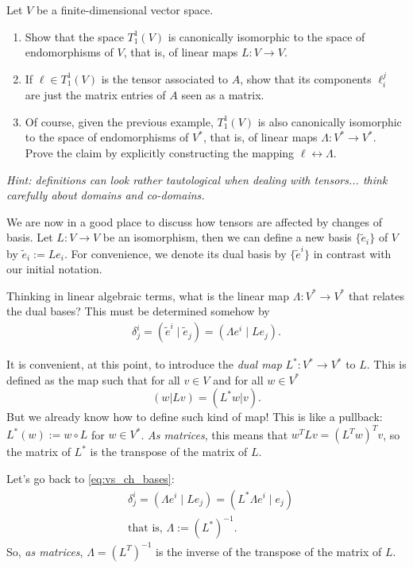 \begin{exercise}\label{exe:iso_vs_endo}
	Let $V$ be a finite-dimensional vector space.
	\begin{enumerate}
		\item Show that the space $T^1_1(V)$ is canonically isomorphic to the space of endomorphisms of $V$, that is, of linear maps $L:V\to V$.

		\item If $\ell\in T^1_1(V)$ is the tensor associated to $A$, show that its components $\ell_i^j$ are just the matrix entries of $A$ seen as a matrix.

		\item Of course, given the previous example, $T^1_1(V)$ is also canonically isomorphic to the space of endomorphisms of $V^*$, that is, of linear maps $\Lambda:V^*\to V^*$.
		      Prove the claim by explicitly constructing the mapping $\ell \leftrightarrow \Lambda$.
	\end{enumerate}
	\textit{\small Hint: definitions can look rather tautological when dealing with tensors... think carefully about domains and co-domains.}
\end{exercise}

We are now in a good place to discuss how tensors are affected by changes of basis.
Let $L: V\to V$ be an isomorphism, then we can define a new basis $\{\widetilde e_i\}$ of $V$ by $\widetilde e_i := L e_i$. For convenience, we denote its dual basis by $\{\widetilde e^i\}$ in contrast with our initial notation.

Thinking in linear algebraic terms, what is the linear map $\Lambda:V^*\to V^*$ that relates the dual bases? This must be determined somehow by
\begin{align}\label{eq:vs_ch_bases}
	\delta^i_j = (\widetilde e^i \mid \widetilde e_j) = (\Lambda e^i \mid L e_j).
\end{align}

It is convenient, at this point, to introduce the \emph{dual map} $L^* : V^* \to V^*$ to $L$.
This is defined as the map such that for all $v\in V$ and for all $w\in V^*$
\begin{equation}
	(w | Lv) = (L^* w | v).
\end{equation}
But we already know how to define such kind of map! This is like a pullback: $L^*(w) := w \circ L$ for $w\in V^*$.
\emph{As matrices}, this means that $w^T L v = (L^T w)^T v$, so the matrix of $L^*$ is the transpose of the matrix of $L$.

Let's go back to \eqref{eq:vs_ch_bases}:
\begin{align}
	 & \delta_j^i = (\Lambda e^i \mid L e_j) = (L^* \Lambda e^i \mid e_j) \\
	 & \mbox{that is, } \Lambda := (L^*)^{-1}.
\end{align}
So, \emph{as matrices}, $\Lambda = (L^T)^{-1}$ is the inverse of the transpose of the matrix of $L$.

